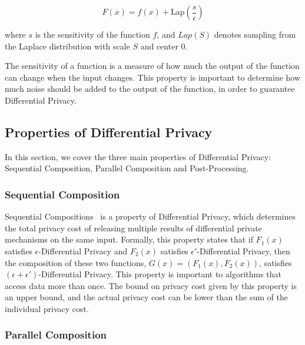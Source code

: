\begin{equation}\label{eq:laplace_mechanism}
    F(x) = f(x) + \text{Lap} (\frac{s}{\epsilon})
\end{equation}

where \(s\) is the sensitivity of the function \(f\), and \(Lap(S)\) denotes sampling from the Laplace distribution with scale \(S\) and center \(0\). 

The sensitivity of a function is a measure of how much the output of the function can change when the input changes. This property is important to determine how much noise should be added to the output of the function, in order to guarantee Differential Privacy. 

\subsection{Properties of Differential Privacy}\label{subsec:properties_differential_privacy}

In this section, we cover the three main properties of Differential Privacy: Sequential Composition, Parallel Composition and Post-Processing.

\subsubsection{Sequential Composition}\label{subsubsec:sequential_composition}

Sequential Compositions~\cite{DP_Book, AlgFoundationsDP} is a property of Differential Privacy, which determines the total privacy cost of releasing multiple results of differential private mechanisms on the same input. Formally, this property states that if \(F_1(x)\) satisfies \(\epsilon\)-Differential Privacy and \(F_2(x)\) satisfies \(\epsilon'\)-Differential Privacy, then the composition of these two functions, \(G(x) = (F_1(x), F_2(x))\), satisfies \((\epsilon + \epsilon')\)-Differential Privacy. This property is important to algorithms that access data more than once. The bound on privacy cost given by this property is an upper bound, and the actual privacy cost can be lower than the sum of the individual privacy cost.

\subsubsection{Parallel Composition}\label{subsubsec:parallel_composition}

